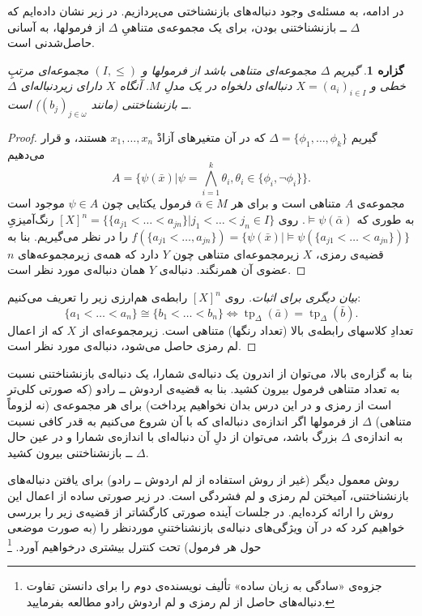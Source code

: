 \documentclass[12pt,a4paper]{report}
\theoremstyle{colorhead}
\newtheorem{prop}[thm]{گزاره}
\DeclareMathOperator{\tp}{tp}
\begin{document}
در ادامه، به مسئله‌ی وجود دنباله‌های بازنشناختی می‌پردازیم. در زیر نشان داده‌ایم که 
$\Delta$ ــ
بازنشناختنی بودن،‌ برای یک مجموعه‌ی متناهیِ
$\Delta$
از فرمولها، به آسانی حاصل‌شدنی است.  
\begin{prop}
\label{indis1}
گیریم 
$\Delta$
مجموعه‌ای متناهی باشد از فرمولها و 
$(I,\leq)$
مجموعه‌ای مرتبِ خطی و 
$X=(a_i)_{i\in I}$
دنباله‌ای دلخواه در یک مدلِ
$M$.
آنگاه
$X$
دارای زیردنباله‌ای
$\Delta$
ــ
بازنشناختنی 
(مانند
$(b_j)_{j\in \omega}$)
است. 
\end{prop}
\begin{proof}
گیریم
$\Delta=\{\phi_1,\ldots,\phi_k\}$
که در آن متغیرهای آزادْ
$x_1,\ldots,x_n$
هستند،
و قرار می‌دهیم
\[
A=\{\psi(\bar{x})| \psi=\bigwedge_{i=1}^k \theta_i, \theta_i\in \{\phi_i,\neg\phi_i\}\}.
\]
مجموعه‌ی
$A$
متناهی است و برای هر
$\bar{\alpha}\in M$
فرمول یکتایی چون
$\psi\in A$
موجود است به طوری که
$\models \psi(\bar{\alpha})$.
روی
$[X]^n=\{\{a_{j1}<\ldots<a_{jn}\}|j_1<\ldots<j_n\in I\}$
رنگ‌آمیزیِ
$f(\{a_{j1}<\ldots,a_{jn}\})=\{\psi(\bar{x})|\models \psi(\{a_{j1}<\ldots<a_{jn}\})\}$
را در نظر می‌گیریم. بنا به قضیه‌ی رمزی،
$X$
زیرمجموعه‌ای متناهی چون
$Y$
دارد که همه‌ی زیرمجموعه‌های
$n$
عضوی آن همرنگند. دنباله‌ی
$Y$
همان دنباله‌ی مورد نظر است. 
\end{proof}
\begin{proof}[بیان دیگری برای اثبات]
روی
$[X]^n$
رابطه‌ی هم‌ارزی زیر را تعریف می‌کنیم:
\[
\{a_1<\ldots<a_n\}\cong \{b_1<\ldots<b_n\}\Leftrightarrow \tp_\Delta(\bar{a})=\tp_\Delta(\bar{b}).
\]
تعدادِ کلاسهای رابطه‌ی بالا (تعداد رنگها) متناهی است. زیرمجموعه‌ای از
$X$
که از اعمال لم رمزی حاصل می‌شود، دنباله‌ی مورد نظر است. 
\end{proof}
بنا به گزاره‌ی بالا، می‌توان از اندرون یک دنباله‌ی شمارا، یک دنباله‌ی بازنشناختنی نسبت به تعداد متناهی فرمول بیرون کشید. بنا به قضیه‌ی اردوش ــ رادو (که صورتی کلی‌تر است از رمزی و در این درس بدان نخواهیم پرداخت)
برای هر مجموعه‌ی
(نه لزوماً متناهی)
$\Delta$
از فرمولها 
اگر اندازه‌ی دنباله‌ای که با آن شروع می‌کنیم به قدر کافی
نسبت به اندازه‌ی
$\Delta$
 بزرگ باشد، می‌توان از دلِ آن دنباله‌ای با اندازه‌ی شمارا و در عین حال
$\Delta$ ــ
بازنشناختنی بیرون کشید.
\par 
روش معمول
دیگر (غیر از روش استفاده از لم اردوش ــ رادو)
 برای یافتن دنباله‌های بازنشناختنی،‌ آمیختن لم رمزی و لم فشردگی است. در زیر 
صورتی ساده از اعمال این روش را ارائه کرده‌ایم. در جلسات آینده صورتی کارگشاتر از قضیه‌ی زیر را بررسی خواهیم کرد که در آن ویژگی‌های دنباله‌ی بازنشناختنیِ موردنظر را (به صورت موضعی حول هر فرمول)
تحت کنترل بیشتری درخواهیم آورد. 
\footnote{جزوه‌ی «سادگی به زبان ساده»‌ تألیف نویسنده‌ی دوم را 
برای دانستن  تفاوت دنباله‌های حاصل از لم رمزی و لم اردوش رادو مطالعه بفرمایید. 
}
\end{document}
